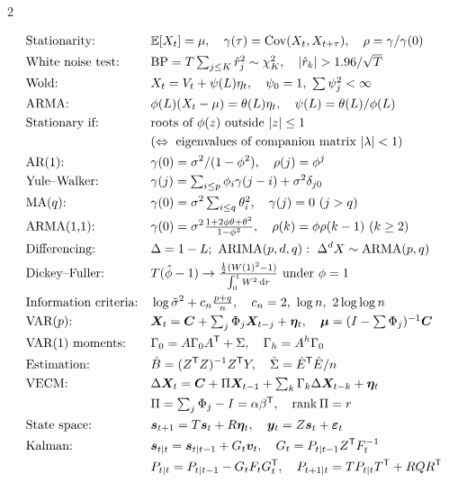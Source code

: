 \begin{paracol}{2}
\begin{keyformulas}
\begin{align*}
&\text{Stationarity:} && \E[X_t]=\mu,\quad \gamma(\tau)=\Cov(X_t,X_{t+\tau}),\quad\rho=\gamma/\gamma(0)\\
&\text{White noise test:} && \mathrm{BP}=T\textstyle\sum_{j\le K}\hat r_j^2\sim\chi^2_K,\quad |\hat r_k|>1.96/\sqrt T\\
&\text{Wold:} && X_t=V_t+\psi(L)\eta_t,\quad \psi_0=1,\ \textstyle\sum\psi_j^2<\infty\\
&\text{ARMA:} && \phi(L)(X_t-\mu)=\theta(L)\eta_t,\quad \psi(L)=\theta(L)/\phi(L)\\
&\text{Stationary if:} && \text{roots of }\phi(z)\text{ outside }|z|\le1\\
& && (\Leftrightarrow\ \text{eigenvalues of companion matrix }|\lambda|<1)\\
&\text{AR(1):} && \gamma(0)=\sigma^2/(1-\phi^2),\quad \rho(j)=\phi^j\\
&\text{Yule--Walker:} && \gamma(j)=\textstyle\sum_{i\le p}\phi_i\gamma(j-i)+\sigma^2\delta_{j0}\\
&\text{MA($q$):} && \gamma(0)=\sigma^2\textstyle\sum_{i\le q}\theta_i^2,\quad \gamma(j)=0\ (j>q)\\
&\text{ARMA(1,1):} && \gamma(0)=\sigma^2\tfrac{1+2\phi\theta+\theta^2}{1-\phi^2},\quad \rho(k)=\phi\rho(k-1)\ (k\ge2)\\
&\text{Differencing:} && \Delta=1-L;\ \text{ARIMA}(p,d,q):\ \Delta^dX\sim\text{ARMA}(p,q)\\
&\text{Dickey--Fuller:} && T(\hat\phi-1)\to\tfrac{\frac12(W(1)^2-1)}{\int_0^1W^2\dd r}\ \text{under }\phi=1\\
&\text{Information criteria:} && \log\tilde\sigma^2+c_n\tfrac{p+q}n,\quad c_n=2,\ \log n,\ 2\log\log n\\
&\text{VAR($p$):} && \bm X_t=\bm C+\textstyle\sum_j\Phi_j\bm X_{t-j}+\bm\eta_t,\quad \bm\mu=(I-\textstyle\sum\Phi_j)^{-1}\bm C\\
&\text{VAR(1) moments:} && \Gamma_0=A\Gamma_0A\T+\Sigma,\quad \Gamma_h=A^h\Gamma_0\\
&\text{Estimation:} && \hat B=(Z\T Z)^{-1}Z\T Y,\quad \tilde\Sigma=\hat E\T\hat E/n\\
&\text{VECM:} && \Delta\bm X_t=\bm C+\Pi\bm X_{t-1}+\textstyle\sum_k\Gamma_k\Delta\bm X_{t-k}+\bm\eta_t\\
& && \Pi=\textstyle\sum_j\Phi_j-I=\alpha\beta\T,\quad \mathrm{rank}\,\Pi=r\\
&\text{State space:} && \bm s_{t+1}=T\bm s_t+R\bm\eta_t,\quad \bm y_t=Z\bm s_t+\bm\varepsilon_t\\
&\text{Kalman:} && \bm s_{t|t}=\bm s_{t|t-1}+G_t\bm v_t,\quad G_t=P_{t|t-1}Z\T F_t^{-1}\\
& && P_{t|t}=P_{t|t-1}-G_tF_tG_t\T,\quad P_{t+1|t}=TP_{t|t}T\T+RQR\T
\end{align*}
\end{keyformulas}


\end{paracol}
